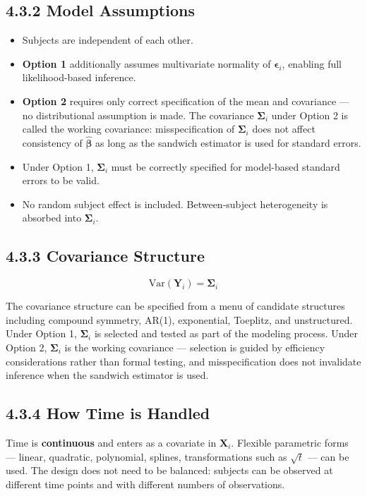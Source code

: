 \documentclass[11pt]{article}
\newcommand{\bY}{\mathbf{Y}}
\newcommand{\bX}{\mathbf{X}}
\newcommand{\bbeta}{\boldsymbol{\beta}}
\newcommand{\bepsilon}{\boldsymbol{\epsilon}}
\newcommand{\bSigma}{\boldsymbol{\Sigma}}
\newcommand{\Var}{\mathrm{Var}}
\begin{document}
\subsection*{4.3.2 Model Assumptions}

\begin{itemize}[leftmargin=2em]
  \item Subjects are independent of each other.
  \item \textbf{Option 1} additionally assumes multivariate normality of $\bepsilon_i$, enabling full likelihood-based inference.
  \item \textbf{Option 2} requires only correct specification of the mean and covariance --- no distributional assumption is made. The covariance $\bSigma_i$ under Option 2 is called the working covariance: misspecification of $\bSigma_i$ does not affect consistency of $\hat{\bbeta}$ as long as the sandwich estimator is used for standard errors.
  \item Under Option 1, $\bSigma_i$ must be correctly specified for model-based standard errors to be valid.
  \item No random subject effect is included. Between-subject heterogeneity is absorbed into $\bSigma_i$.
\end{itemize}

\subsection*{4.3.3 Covariance Structure}

$$\Var(\bY_i) = \bSigma_i$$

The covariance structure can be specified from a menu of candidate structures including compound symmetry, AR(1), exponential, Toeplitz, and unstructured. Under Option 1, $\bSigma_i$ is selected and tested as part of the modeling process. Under Option 2, $\bSigma_i$ is the working covariance --- selection is guided by efficiency considerations rather than formal testing, and misspecification does not invalidate inference when the sandwich estimator is used.

\subsection*{4.3.4 How Time is Handled}

Time is \textbf{continuous} and enters as a covariate in $\bX_i$. Flexible parametric forms --- linear, quadratic, polynomial, splines, transformations such as $\sqrt{t}$ --- can be used. The design does not need to be balanced: subjects can be observed at different time points and with different numbers of observations.
\end{document}
